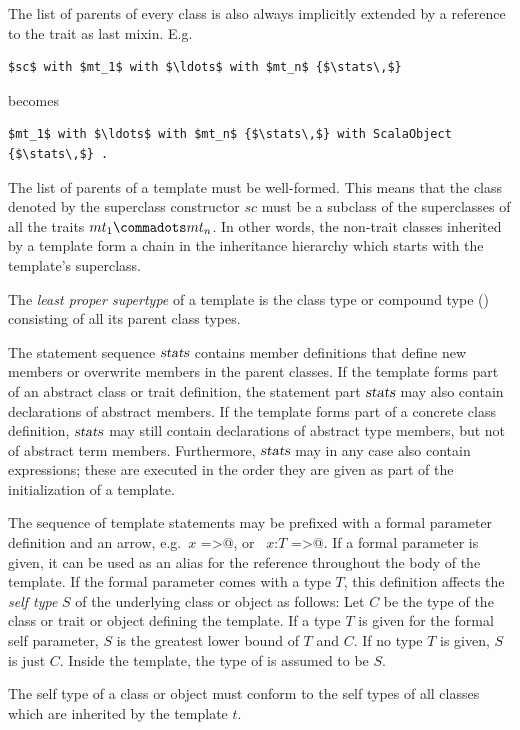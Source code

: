 The list of parents of every class is also always implicitly extended
by a reference to the  trait as last
mixin. E.g.\
\begin{lstlisting}
$sc$ with $mt_1$ with $\ldots$ with $mt_n$ {$\stats\,$}
\end{lstlisting}
becomes
\begin{lstlisting}
$mt_1$ with $\ldots$ with $mt_n$ {$\stats\,$} with ScalaObject {$\stats\,$} .
\end{lstlisting}

The list of parents of a template must be well-formed. This means that
the class denoted by the superclass constructor $sc$ must be a
subclass of the superclasses of all the traits $mt_1 \commadots mt_n$.
In other words, the non-trait classes inherited by a template form a
chain in the inheritance hierarchy which starts with the template's
superclass.

The {\em least proper supertype} of a template is the class type or
compound type (\sref{sec:compound-types}) consisting of all its parent
class types. 

The statement sequence $\mbox{\sl stats}$ contains member definitions that
define new members or overwrite members in the parent classes.  If the
template forms part of an abstract class or trait definition, the
statement part $\mbox{\sl stats}$ may also contain declarations of abstract
members. If the template forms part of a concrete class definition,
$\mbox{\sl stats}$ may still contain declarations of abstract type members, but
not of abstract term members.  Furthermore, $\mbox{\sl stats}$ may in any case
also contain expressions; these are executed in the order they are
given as part of the initialization of a template.

The sequence of template statements may be prefixed with a formal
parameter definition and an arrow, e.g.\ \lstinline@$x$ =>@, or
~\lstinline@$x$:$T$ =>@.  If a formal parameter is given, it can be
used as an alias for the reference \lstinline@this@ throughout the
body of the template.  
If the formal parameter comes with a type $T$, this definition affects
the {\em self type} $S$ of the underlying class or object as follows:  Let $C$ be the type
of the class or trait or object defining the template.
If a type $T$ is given for the formal self parameter, $S$
is the greatest lower bound of $T$ and $C$.
If no type $T$ is given, $S$ is just $C$.
Inside the template, the type of  is assumed to be $S$.

The self type of a class or object must conform to the self types of
all classes which are inherited by the template $t$. 

